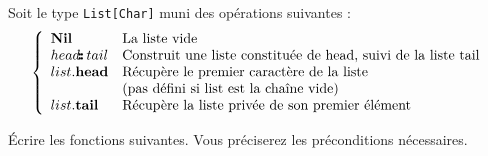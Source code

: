 \documentclass[10pt]{article}\usepackage[nu]{esial}
\begin{document}
\Exercice Soit le type \texttt{List[Char]} muni des opérations suivantes :
$$\left\{
\begin{array}{ll}
  \mathbf{Nil}&\text{La liste vide}\\
  head\text{\textbf{$\!$:$\!$:}}\, tail& \text{Construit une liste constituée de head, suivi de la liste tail}\\
  list\mathbf{.head}& \text{Récupère le premier caractère de la liste}\\
  &\text{(pas défini si list est la chaîne vide)}\\
  list\mathbf{.tail}& \text{Récupère la liste privée de son premier élément}
\end{array}\right.
$$

\noindent Écrire les fonctions suivantes. Vous préciserez les préconditions
nécessaires.
\end{document}
